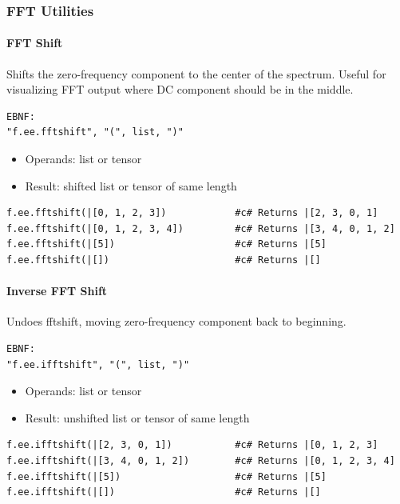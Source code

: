 \subsubsection{FFT Utilities}

\paragraph{FFT Shift}
Shifts the zero-frequency component to the center of the spectrum. Useful for visualizing FFT output where DC component should be in the middle.
\begin{verbatim}
EBNF:
"f.ee.fftshift", "(", list, ")"
\end{verbatim}
\begin{itemize}
\item Operands: list or tensor
\item Result: shifted list or tensor of same length
\end{itemize}
\begin{verbatim}
f.ee.fftshift(|[0, 1, 2, 3])            #c# Returns |[2, 3, 0, 1]
f.ee.fftshift(|[0, 1, 2, 3, 4])         #c# Returns |[3, 4, 0, 1, 2]
f.ee.fftshift(|[5])                     #c# Returns |[5]
f.ee.fftshift(|[])                      #c# Returns |[]
\end{verbatim}

\paragraph{Inverse FFT Shift}
Undoes fftshift, moving zero-frequency component back to beginning.
\begin{verbatim}
EBNF:
"f.ee.ifftshift", "(", list, ")"
\end{verbatim}
\begin{itemize}
\item Operands: list or tensor
\item Result: unshifted list or tensor of same length
\end{itemize}
\begin{verbatim}
f.ee.ifftshift(|[2, 3, 0, 1])           #c# Returns |[0, 1, 2, 3]
f.ee.ifftshift(|[3, 4, 0, 1, 2])        #c# Returns |[0, 1, 2, 3, 4]
f.ee.ifftshift(|[5])                    #c# Returns |[5]
f.ee.ifftshift(|[])                     #c# Returns |[]
\end{verbatim}

